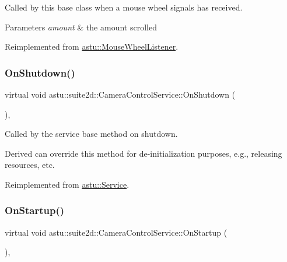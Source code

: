 Called by this base class when a mouse wheel signals has received.


\begin{DoxyParams}{Parameters}
{\em amount} & the amount scrolled \\
\hline
\end{DoxyParams}


Reimplemented from \hyperlink{classastu_1_1MouseWheelListener_ae159bccdfb49aadd58079fb6ce32e914}{astu\+::\+Mouse\+Wheel\+Listener}.

\mbox{\label{classastu_1_1suite2d_1_1CameraControlService_aaf485c9ed16494fc52ce3ebe34b1e4d9}} 
\subsubsection{\texorpdfstring{On\+Shutdown()}{OnShutdown()}}
{\footnotesize\ttfamily virtual void astu\+::suite2d\+::\+Camera\+Control\+Service\+::\+On\+Shutdown (\begin{DoxyParamCaption}{ }\end{DoxyParamCaption})\hspace{0.3cm}{\ttfamily [override]}, {\ttfamily [virtual]}}

Called by the service base method on shutdown.

Derived can override this method for de-\/initialization purposes, e.\+g., releasing resources, etc. 

Reimplemented from \hyperlink{classastu_1_1Service_a1e1dff727df791c57fae782d8a613c5f}{astu\+::\+Service}.

\mbox{\label{classastu_1_1suite2d_1_1CameraControlService_a7965cdf848813b62aed86ecc8c34fcc8}} 
\subsubsection{\texorpdfstring{On\+Startup()}{OnStartup()}}
{\footnotesize\ttfamily virtual void astu\+::suite2d\+::\+Camera\+Control\+Service\+::\+On\+Startup (\begin{DoxyParamCaption}{ }\end{DoxyParamCaption})\hspace{0.3cm}{\ttfamily [override]}, {\ttfamily [virtual]}}


